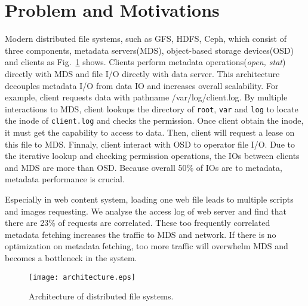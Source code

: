 \section{Problem and Motivations}

Modern distributed file systems, such as GFS\cite{ghemawat2003google}, HDFS\cite{shvachko2010hadoop}, Ceph\cite{weil2006ceph}, which consist of three components, metadata servers(MDS), object-based storage devices(OSD) and clients as Fig.~\ref{fig:architecture} shows. Clients perform metadata operations(\emph{open, stat}) directly with MDS and file I/O directly with data server. This architecture decouples metadata I/O from data IO and increases overall scalability. For example, client requests data with pathname /var/log/client.log. By multiple interactions to MDS, client lookups the directory of \texttt{root}, \texttt{var} and \texttt{log} to locate the inode of \texttt{client.log} and checks the permission. Once client obtain the inode, it must get the capability to access to data. Then, client will request a lease on this file to MDS. Finnaly, client interact with OSD to operator file I/O. Due to the iterative lookup and checking permission operations, the IOs between clients and MDS are more than OSD. Because overall 50\% of IOs are to metadata\cite{roselli2000comparison}, metadata performance is crucial.

Especially in web content system, loading one web file leads to multiple scripts and images requesting. We analyse the access log\cite{zhang2016composite} of web server and find that there are 23\% of requests are correlated. These too frequently correlated metadata fetching increases the traffic to MDS and network. If there is no optimization on metadata fetching, too more traffic will overwhelm MDS and becomes a bottleneck in the system.

\begin{figure}[htbp]
  \centering
  \texttt{[image: architecture.eps]}\\
  \caption{Architecture of distributed file systems.}\label{fig:architecture}
\end{figure}


